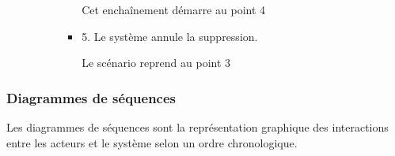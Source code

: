 \begin{itemize}
\begin{itemize}
\begin{itemize}
\begin{itemize}
				                        Cet enchaînement démarre au point 4

				                  \item 5. Le système annule la suppression.

				                        Le scénario reprend au point 3
			                  \end{itemize}
		            \end{itemize}
	      \end{itemize}
\end{itemize}

\subsubsection{Diagrammes de séquences}

Les diagrammes de séquences sont la représentation graphique des interactions entre les acteurs et le système selon un ordre chronologique.

